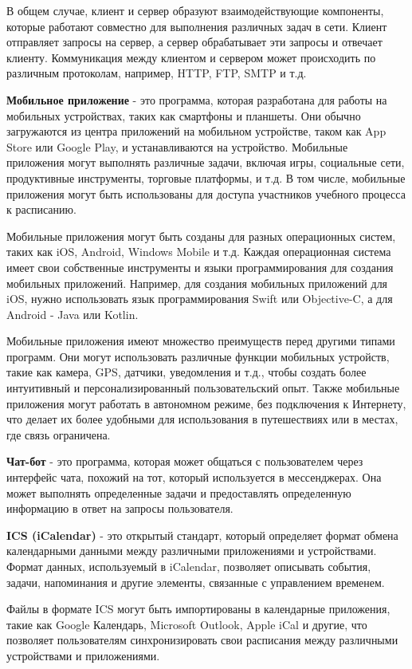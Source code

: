 В общем случае, клиент и сервер образуют взаимодействующие компоненты,
которые работают совместно для выполнения различных задач в сети.
Клиент отправляет запросы на сервер, а сервер обрабатывает эти запросы и отвечает клиенту.
Коммуникация между клиентом и сервером может происходить по различным протоколам, например, HTTP, FTP, SMTP и т.д.

\textbf{Мобильное приложение} - это программа, которая разработана для работы на мобильных устройствах,
таких как смартфоны и планшеты. Они обычно загружаются из центра приложений на мобильном устройстве,
таком как App Store или Google Play, и устанавливаются на устройство.
Мобильные приложения могут выполнять различные задачи, включая игры, социальные сети,
продуктивные инструменты, торговые платформы, и т.д.
В том числе, мобильные приложения могут быть использованы для доступа участников учебного процесса к расписанию.

Мобильные приложения могут быть созданы для разных операционных систем, 
таких как iOS, Android, Windows Mobile и т.д.
Каждая операционная система имеет свои собственные инструменты и языки программирования для создания мобильных приложений.
Например, для создания мобильных приложений для iOS,
нужно использовать язык программирования Swift или Objective-C, а для Android - Java или Kotlin.

Мобильные приложения имеют множество преимуществ перед другими типами программ.
Они могут использовать различные функции мобильных устройств, такие как камера, GPS, датчики, уведомления и т.д.,
чтобы создать более интуитивный и персонализированный пользовательский опыт.
Также мобильные приложения могут работать в автономном режиме, без подключения к Интернету,
что делает их более удобными для использования в путешествиях или в местах, где связь ограничена.

\textbf{Чат-бот} - это программа, которая может общаться с пользователем через интерфейс чата, 
похожий на тот, который используется в мессенджерах. 
Она может выполнять определенные задачи и предоставлять определенную информацию в ответ на запросы пользователя.

\textbf{ICS (iCalendar)} - это открытый стандарт, 
который определяет формат обмена календарными данными между различными приложениями и устройствами. 
Формат данных, используемый в iCalendar, позволяет описывать события, задачи, напоминания и другие элементы, 
связанные с управлением временем.

Файлы в формате ICS могут быть импортированы в календарные приложения, 
такие как Google Календарь, Microsoft Outlook, Apple iCal и другие, 
что позволяет пользователям синхронизировать свои расписания между различными устройствами и приложениями.

